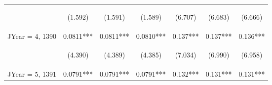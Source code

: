 \documentclass[]{article}
\begin{document}
\begin{center}
\begin{tabular}{lcccccc}
        \vspace{4pt}     & \begin{footnotesize}(1.592)\end{footnotesize}  & \begin{footnotesize}(1.591)\end{footnotesize}  & \begin{footnotesize}(1.589)\end{footnotesize}  & \begin{footnotesize}(6.707)\end{footnotesize}   & \begin{footnotesize}(6.683)\end{footnotesize}  & \begin{footnotesize}(6.666)\end{footnotesize}  \\
        JYear = 4, 1390  & 0.0811***                                      & 0.0811***                                      & 0.0810***                                      & 0.137***                                        & 0.137***                                       & 0.136***                                       \\
        \vspace{4pt}     & \begin{footnotesize}(4.390)\end{footnotesize}  & \begin{footnotesize}(4.389)\end{footnotesize}  & \begin{footnotesize}(4.385)\end{footnotesize}  & \begin{footnotesize}(7.034)\end{footnotesize}   & \begin{footnotesize}(6.990)\end{footnotesize}  & \begin{footnotesize}(6.958)\end{footnotesize}  \\
        JYear = 5, 1391  & 0.0791***                                      & 0.0791***                                      & 0.0791***                                      & 0.132***                                        & 0.131***                                       & 0.131***                                       \\

\end{tabular}
\end{center}
\end{document}
